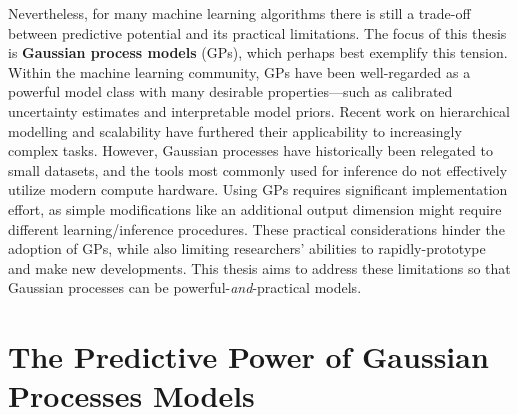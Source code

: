 Nevertheless, for many machine learning algorithms there is still a trade-off between predictive potential and its practical limitations.
The focus of this thesis is {\bf Gaussian process models} (GPs), which perhaps best exemplify this tension.
Within the machine learning community, GPs have been well-regarded as a powerful model class with many desirable properties---such as calibrated uncertainty estimates and interpretable model priors.
Recent work on hierarchical modelling \citep[e.g.][]{damianou2013deep} and scalability \citep[e.g.][]{wilson2015kernel} have furthered their applicability to increasingly complex tasks.
However, Gaussian processes have historically been relegated to small datasets, and the tools most commonly used for inference do not effectively utilize modern compute hardware.
Using GPs requires significant implementation effort, as simple modifications like an additional output dimension might require different learning/inference procedures.
These practical considerations hinder the adoption of GPs, while also limiting researchers' abilities to rapidly-prototype and make new developments.
This thesis aims to address these limitations so that Gaussian processes can be powerful-\emph{and}-practical models.


\section{The Predictive Power of Gaussian Processes Models}

